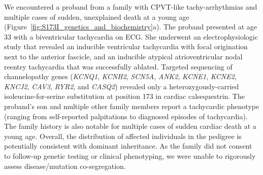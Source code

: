 We encountered a proband from a family with CPVT-like tachy-arrhythmias and multiple cases of sudden, unexplained death at a young age (Figure~\ref{fig:S173I_genetics_and_biochemistry}a). The proband presented at age 33 with a biventricular tachycardia on ECG. She underwent an electrophysiologic study that revealed an inducible ventricular tachycardia with focal origination next to the anterior fascicle, and an inducible atypical atrioventricular nodal reentry tachycardia that was successfully ablated. Targeted sequencing of channelopathy genes (\textit{KCNQ1}, \textit{KCNH2}, \textit{SCN5A}, \textit{ANK2}, \textit{KCNE1}, \textit{KCNE2}, \textit{KNCJ2}, \textit{CAV3}, \textit{RYR2}, and \textit{CASQ2}) revealed only a heterozygously-carried isoleucine-for-serine substitution at position 173 in cardiac calsequestrin. The proband's son and multiple other family members report a tachycardic phenotype (ranging from self-reported palpitations to diagnosed episodes of tachycardia). The family history is also notable for multiple cases of sudden cardiac death at a young age. Overall, the distribution of affected individuals in the pedigree is potentially consistent with dominant inheritance. As the family did not consent to follow-up genetic testing or clinical phenotyping, we were unable to rigorously assess disease/mutation co-segregation.

